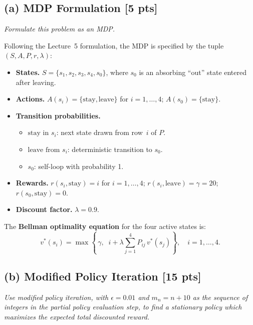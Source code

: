 \documentclass[12pt]{article}
\begin{document}
\subsection*{(a) MDP Formulation \hfill [5 pts]}

\textit{Formulate this problem as an MDP.}

Following the Lecture~5 formulation, the MDP is specified by the tuple $(S, A, P, r, \lambda)$:

\begin{itemize}[nosep]
  \item \textbf{States.} $S = \{s_1, s_2, s_3, s_4, s_0\}$, where $s_0$ is an absorbing ``out'' state entered after leaving.
  \item \textbf{Actions.} $A(s_i) = \{\text{stay}, \text{leave}\}$ for $i = 1,\ldots,4$; \; $A(s_0) = \{\text{stay}\}$.
  \item \textbf{Transition probabilities.}
    \begin{itemize}[nosep]
      \item $\text{stay in } s_i$: next state drawn from row~$i$ of $P$.
      \item $\text{leave from } s_i$: deterministic transition to $s_0$.
      \item $s_0$: self-loop with probability 1.
    \end{itemize}
  \item \textbf{Rewards.}
    $r(s_i, \text{stay}) = i$ for $i=1,\ldots,4$; \;
    $r(s_i, \text{leave}) = \gamma = 20$; \;
    $r(s_0, \text{stay}) = 0$.
  \item \textbf{Discount factor.} $\lambda = 0.9$.
\end{itemize}

The \textbf{Bellman optimality equation} for the four active states is:
\[
  v^*(s_i) = \max\!\left\{\, \gamma,\;\; i + \lambda \sum_{j=1}^{4} P_{ij}\, v^*(s_j) \right\}, \quad i = 1, \ldots, 4.
\]

\subsection*{(b) Modified Policy Iteration \hfill [15 pts]}

\textit{Use modified policy iteration, with $\epsilon = 0.01$ and $m_n = n + 10$ as the sequence of integers in the partial policy evaluation step, to find a stationary policy which maximizes the expected total discounted reward.}
\end{document}
